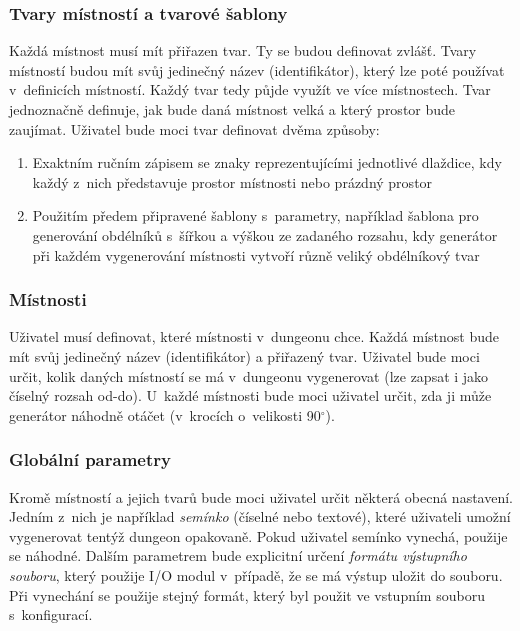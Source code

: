 \subsubsection{Tvary místností a tvarové šablony}
Každá místnost musí mít přiřazen tvar.
Ty se budou definovat zvlášť.
Tvary místností budou mít svůj jedinečný název (identifikátor), který lze poté používat v~definicích místností.
Každý tvar tedy půjde využít ve více místnostech.
Tvar jednoznačně definuje, jak bude daná místnost velká a který prostor bude zaujímat.
Uživatel bude moci tvar definovat dvěma způsoby:
\begin{enumerate}
    \item Exaktním ručním zápisem se znaky reprezentujícími jednotlivé dlaždice, kdy každý z~nich představuje prostor místnosti nebo prázdný prostor
    \item Použitím předem připravené šablony s~parametry, například šablona pro generování obdélníků s~šířkou a výškou ze zadaného rozsahu, kdy generátor při každém vygenerování místnosti vytvoří různě veliký obdélníkový tvar
\end{enumerate}

\subsubsection{Místnosti}
Uživatel musí definovat, které místnosti v~dungeonu chce.
Každá místnost bude mít svůj jedinečný název (identifikátor) a přiřazený tvar.
Uživatel bude moci určit, kolik daných místností se má v~dungeonu vygenerovat (lze zapsat i jako číselný rozsah od-do).
U~každé místnosti bude moci uživatel určit, zda ji může generátor náhodně otáčet (v~krocích o~velikosti 90$^{\circ}$).

\subsubsection{Globální parametry}
Kromě místností a jejich tvarů bude moci uživatel určit některá obecná nastavení.
Jedním z~nich je například \textit{semínko} (číselné nebo textové), které uživateli umožní vygenerovat tentýž dungeon opakovaně.
Pokud uživatel semínko vynechá, použije se náhodné.
Dalším parametrem bude explicitní určení \textit{formátu výstupního souboru}, který použije I/O modul v~případě, že se má výstup uložit do souboru.
Při vynechání se použije stejný formát, který byl použit ve vstupním souboru s~konfigurací.


